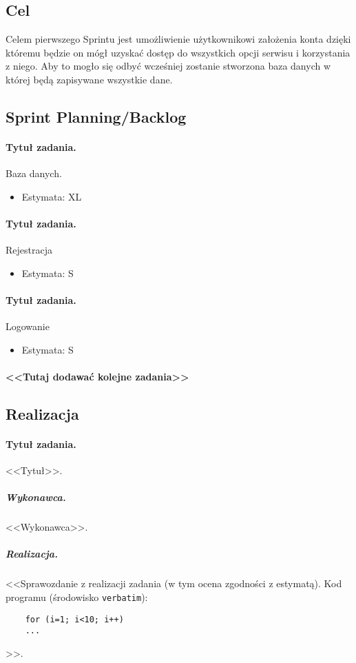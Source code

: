 \documentclass[a4paper]{article}
\begin{document}
	\subsection{Cel} Celem pierwszego Sprintu jest umożliwienie użytkownikowi założenia konta dzięki któremu będzie on mógł uzyskać dostęp do wszystkich opcji serwisu i korzystania z niego. Aby to mogło się odbyć wcześniej zostanie stworzona baza danych w której będą zapisywane wszystkie dane.
	\subsection{Sprint Planning/Backlog}
	
	\paragraph{Tytuł zadania.} Baza danych.
	\begin{itemize}
		\item Estymata: XL
	\end{itemize}
	
	\paragraph{Tytuł zadania.} Rejestracja
	\begin{itemize}
		\item Estymata: S
	\end{itemize}
	
	\paragraph{Tytuł zadania.} Logowanie
	\begin{itemize}
		\item Estymata: S
	\end{itemize}
	
	\paragraph{<<Tutaj dodawać kolejne zadania>>}
	
	\subsection{Realizacja}
	
	\paragraph{Tytuł zadania.} <<Tytuł>>.
	\subparagraph{Wykonawca.} <<Wykonawca>>.
	\subparagraph{Realizacja.} <<Sprawozdanie z realizacji zadania (w tym ocena zgodności z estymatą). Kod programu (środowisko \texttt{verbatim}): \begin{verbatim}
	for (i=1; i<10; i++)
	...
	\end{verbatim}>>.
	
\end{document}
